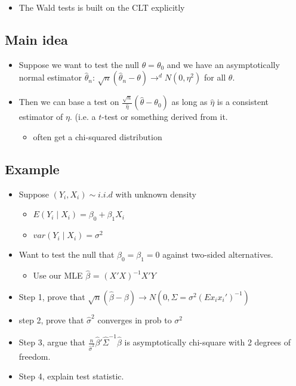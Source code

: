 \begin{itemize}
\item The Wald tests is built on the CLT explicitly
\end{itemize}

\subsection{Main idea}

\begin{itemize}
\item Suppose we want to test the null $\theta = \theta_0$ and we have
      an asymptotically normal estimator $\hat\theta_n$: $\sqrt{n}
      (\hat\theta_n - \theta) \to^d N(0,\eta^2)$ for all $\theta$.
\item Then we can base a test on $\frac{\sqrt{n}}{\hat\eta}
      (\hat\theta - \theta_0)$ as long as $\hat\eta$ is a consistent
      estimator of $\eta$. (i.e. a $t$-test or something derived from it.
\begin{itemize}
\item often get a chi-squared distribution
\end{itemize}
\end{itemize}

\subsection{Example}

\begin{itemize}
\item Suppose $(Y_i, X_i) \sim i.i.d$ with unknown density
\begin{itemize}
\item $E(Y_i \mid X_i) = \beta_0 + \beta_1 X_i$
\item $var(Y_i \mid X_i) = \sigma^2$
\end{itemize}
\item Want to test the null that $\beta_0 = \beta_1 = 0$ against
       two-sided alternatives.
\begin{itemize}
\item Use our MLE $\hat\beta$ = $(X'X)^{-1} X'Y$
\end{itemize}
\item Step 1, prove that $\sqrt{n}(\hat\beta - \beta) \to N(0, \Sigma = \sigma^2 (E x_i x_i')^{-1})$
\item step 2, prove that $\hat\sigma^2$ converges in prob to $\sigma^2$
\item Step 3, argue that $\frac{n}{\hat\sigma^2}
       \hat\beta'\hat\Sigma^{-1} \hat\beta$ is asymptotically
       chi-square with 2 degrees of freedom.
\item Step 4, explain test statistic.
\end{itemize}

